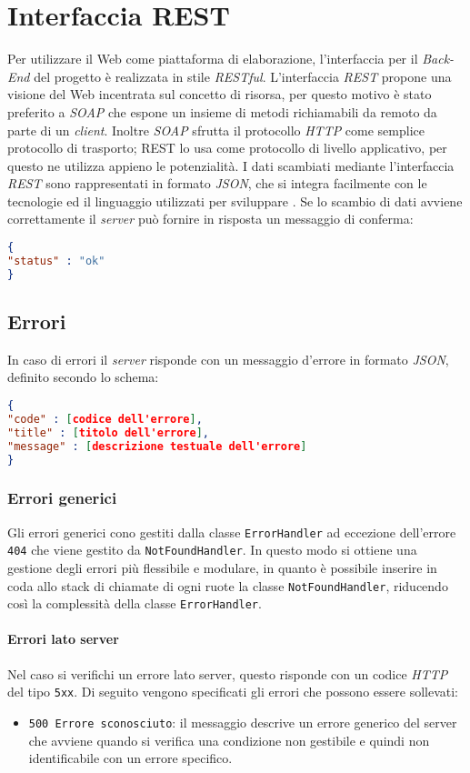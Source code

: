 \newpage
\section{Interfaccia REST}
Per utilizzare il Web come piattaforma di elaborazione, l'interfaccia per il \textit{Back-End} del progetto \progetto è realizzata in stile \textit{RESTful}.
L'interfaccia \textit{REST} propone una visione del Web incentrata sul concetto di risorsa, per questo motivo è stato preferito a \textit{SOAP} che espone un insieme di metodi richiamabili da remoto da parte di un \textit{client}. Inoltre \textit{SOAP} sfrutta il protocollo \textit{HTTP} come semplice protocollo di trasporto; REST lo usa come  protocollo di livello applicativo, per questo ne utilizza appieno le potenzialità.
I dati scambiati mediante l'interfaccia \textit{REST} sono rappresentati in formato \textit{JSON}, che si integra facilmente con le tecnologie ed il linguaggio utilizzati per sviluppare \progetto.
Se lo scambio di dati avviene correttamente il \textit{server} può fornire in risposta un messaggio di conferma:
\begin{lstlisting}[language=json,firstnumber=1]
{
"status" : "ok"
}
\end{lstlisting}
\subsection{Errori}
In caso di errori il \textit{server} risponde con un messaggio d'errore in formato \textit{JSON}, definito secondo lo schema:
\begin{lstlisting}[language=json,firstnumber=1]
{
"code" : [codice dell'errore],
"title" : [titolo dell'errore],
"message" : [descrizione testuale dell'errore]
}
\end{lstlisting}
\subsubsection{Errori generici}
Gli errori generici cono gestiti dalla classe \texttt{ErrorHandler} ad eccezione dell'errore \texttt{404} che viene gestito da \texttt{NotFoundHandler}. In questo modo si ottiene una gestione degli errori più flessibile e modulare, in quanto è possibile inserire in coda allo stack di chiamate di ogni ruote la classe \texttt{NotFoundHandler}, riducendo così la complessità della classe \texttt{ErrorHandler}.

\paragraph{Errori lato server}
Nel caso si verifichi un errore lato server, questo risponde con un codice \textit{HTTP} del tipo \texttt{5xx}. Di seguito vengono specificati gli errori che possono essere sollevati:
	\begin{itemize}
		\item \texttt{500 Errore sconosciuto}: il messaggio descrive un errore generico del server che avviene quando si verifica una condizione non gestibile e quindi non identificabile con un errore specifico.
	\end{itemize}
